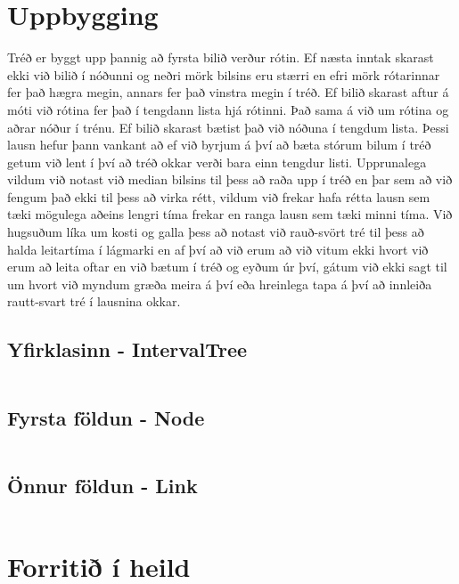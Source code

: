 \documentclass{article}
\begin{document}
\section {Uppbygging}

Tréð er byggt upp þannig að fyrsta bilið verður rótin. Ef næsta inntak skarast ekki við bilið í nóðunni og neðri mörk bilsins eru stærri en efri mörk rótarinnar fer það hægra megin, annars fer það vinstra megin í tréð. Ef bilið skarast aftur á móti við rótina fer það í tengdann lista hjá rótinni. Það sama á við um rótina og aðrar nóður í trénu. Ef bilið skarast bætist það við nóðuna í tengdum lista. Þessi lausn hefur þann vankant að ef við byrjum á því að bæta stórum bilum í tréð getum við lent í því að tréð okkar verði bara einn tengdur listi. Upprunalega vildum við notast við median bilsins til þess að raða upp í tréð en þar sem að við fengum það ekki til þess að virka rétt, vildum við frekar hafa rétta lausn sem tæki mögulega aðeins lengri tíma frekar en ranga lausn sem tæki minni tíma. Við hugsuðum líka um kosti og galla þess að notast við rauð-svört tré til þess að halda leitartíma í lágmarki en af því að við erum að við vitum ekki hvort við erum að leita oftar en við bætum í tréð og eyðum úr því, gátum við ekki sagt til um hvort við myndum græða meira á því eða hreinlega tapa á því að innleiða rautt-svart tré í lausnina okkar.

\subsection{Yfirklasinn - IntervalTree}
\inputminted{java}{Foll.java}

\subsection{Fyrsta földun - Node}
\inputminted{java}{Node.java}

\subsection{Önnur földun - Link}
\inputminted{java}{Link.java}

\pagebreak

\section {Forritið í heild}

\inputminted[mathescape,
               linenos,
               numbersep=10pt,
               gobble=0,
               frame=lines,
               framesep=2mm]{java}{../IntervalTree.java}
\end{document}
